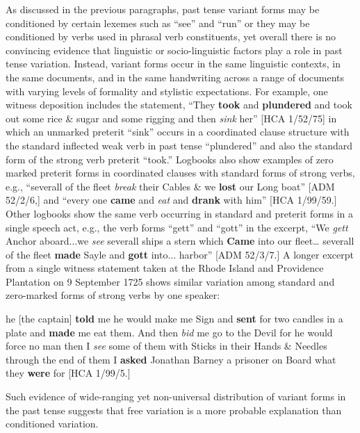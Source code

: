 \begin{styleStandard}
As discussed in the previous paragraphs, past tense variant forms may be conditioned by certain lexemes such as “see” and “run” or they may be conditioned by verbs used in phrasal verb constituents, yet overall there is no convincing evidence that linguistic or socio-linguistic factors play a role in past tense variation. Instead, variant forms occur in the same linguistic contexts, in the same documents, and in the same handwriting across a range of documents with varying levels of formality and stylistic expectations. For example, one witness deposition includes the statement, “They \textbf{took }and \textbf{plundered} and took out some rice \& sugar and some rigging and then \textit{sink} her” [HCA 1/52/75] in which an unmarked preterit “sink” occurs in a coordinated clause structure with the standard inflected weak verb in past tense “plundered” and also the standard form of the strong verb preterit “took.” Logbooks also show examples of zero marked preterit forms in coordinated clauses with standard forms of strong verbs, e.g., “severall of the fleet \textit{break} their Cables \& we\textbf{ lost} our Long boat” [ADM 52/2/6,] and “every one \textbf{came} and \textit{eat} and \textbf{drank} with him” [HCA 1/99/59.] Other logbooks show the same verb occurring in standard and preterit forms in a single speech act, e.g., the verb forms “gett” and “gott” in the excerpt, “We \textit{gett }Anchor aboard...we \textit{see} severall ships a stern which \textbf{Came} into our fleet… severall of the fleet \textbf{made} Sayle and \textbf{gott} into... harbor” [ADM 52/3/7.] A longer excerpt from a single witness statement taken at the Rhode Island and Providence Plantation on 9 September 1725 shows similar variation among standard and zero-marked forms of strong verbs by one speaker:
\end{styleStandard}

\begin{styleStandard}
he [the captain] \textbf{told} me he would make me Sign and \textbf{sent} for two candles in a plate and \textbf{made} me eat them. And then\textit{ bid} me go to the Devil for he would force no man then I\textit{ see} some of them with Sticks in their Hands \& Needles through the end of them I \textbf{asked} Jonathan Barney a prisoner on Board what they \textbf{were} for [HCA 1/99/5.]
\end{styleStandard}

\begin{styleStandard}
Such evidence of wide-ranging yet non-universal distribution of variant forms in the past tense suggests that free variation is a more probable explanation than conditioned variation.
\end{styleStandard}

